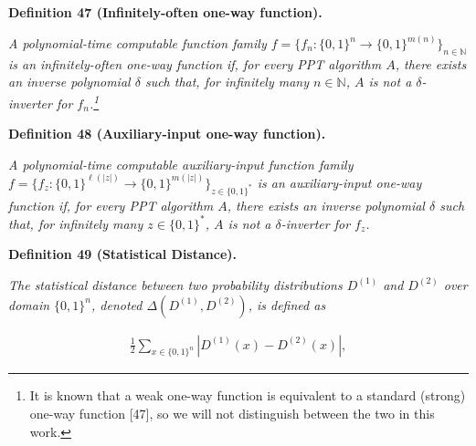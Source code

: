 \documentclass[10pt,a4paper]{article}
\begin{document}




\par\medskip\noindent\textbf{
\textbf{Definition 47}\textbf{ }(Infinitely-often one-way function)\textbf{.}
}\par



\emph{A polynomial-time computable function family $f=\{f_{n}:\{0,1\}^{n}\to\{0,1\}^{m(n)}\}_{n\in\mathbb{N}}$ is an infinitely-often one-way function if, for every PPT algorithm $A$, there exists an inverse polynomial $\delta$ such that, for infinitely many $n\in\mathbb{N}$, $A$ is not a $\delta$-inverter for $f_{n}$.\footnote{It is known that a weak one-way function is equivalent to a standard (strong) one-way function [47], so we will not distinguish between the two in this work.}}\par







\par\medskip\noindent\textbf{
\textbf{Definition 48}\textbf{ }(Auxiliary-input one-way function)\textbf{.}
}\par



\emph{A polynomial-time computable auxiliary-input function family $f=\{f_{z}:\{0,1\}^{\ell(|z|)}\to\{0,1\}^{m(|z|)}\}_{z\in\{0,1\}^{*}}$ is an auxiliary-input one-way function if, for every PPT algorithm $A$, there exists an inverse polynomial $\delta$ such that, for infinitely many $z\in\{0,1\}^{*}$, $A$ is not a $\delta$-inverter for $f_{z}$.}\par







\par\medskip\noindent\textbf{
\textbf{Definition 49}\textbf{ }(Statistical Distance)\textbf{.}
}\par



\emph{The statistical distance between two probability distributions $D^{(1)}$ and $D^{(2)}$ over domain $\{0,1\}^{n}$, denoted $\Delta(D^{(1)},D^{(2)})$, is defined as}\par


\[\begin{gathered}
\frac{1}{2}\sum_{x\in\{0,1\}^{n}}\left|D^{(1)}(x)-D^{(2)}(x)\right|,
\end{gathered}\]
\end{document}
